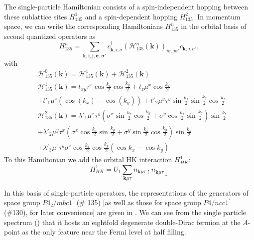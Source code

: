 \documentclass[prb,aps,amssymb,twocolumn,notitlepage]{revtex4-2}
\begin{document}
The single-particle Hamiltonian consists of a spin-independent hopping between these sublattice sites $H^{1}_{135}$ and a spin-dependent hopping $H^{2}_{135}$. 
In momentum space, we can write the corresponding Hamiltonians $H^{n}_{135}$ in the orbital basis of second quantized operators as
 \begin{equation}
 H^{n}_{135} = \sum_\mathbf{\mathbf{k},i,j,\sigma,\sigma'}c^\dagger_{\mathbf{k},i,\sigma}(\mathcal{H}^{n}_{135}(\mathbf{k}))_{i\sigma,j\sigma'} c_{\mathbf{k},j,\sigma'},
 \end{equation}
 with
\begin{align}
    \label{eq:135 Hamiltonian}
    &\mathcal{H}^{0}_{135}(\mathbf{k})=\mathcal{H}^{1}_{135}(\mathbf{k})+\mathcal{H}^{2}_{135}(\mathbf{k})\nonumber \\
    &\mathcal{H}^{1}_{135}(\mathbf{k})=t_{xy}\tau^x\cos\tfrac{k_x}{2}\cos\tfrac{k_y}{2}+t_{z}\mu^x\cos\tfrac{k_z}{2} \\
    &+t'_{1}\mu^z(\cos(k_x)-\cos(k_y))+t'_{2}\mu^y\tau^y\sin\tfrac{k_x}{2}\sin\tfrac{k_y}{2}\cos\tfrac{k_z}{2} \nonumber \\
    &\mathcal{H}^{2}_{135}(\mathbf{k})=\lambda'_{1}\mu^x\tau^y\left(\sigma^x\sin\tfrac{k_x}{2}\cos\tfrac{k_y}{2}+\sigma^y\cos\tfrac{k_x}{2}\sin\tfrac{k_y}{2}\right)\sin\tfrac{k_z}{2} \nonumber\\
    &+\lambda'_{2}\mu^y\tau^x\left(\sigma^x\cos\tfrac{k_x}{2}\sin\tfrac{k_y}{2}+\sigma^y\sin\tfrac{k_x}{2}\cos\tfrac{k_y}{2}\right)\sin\tfrac{k_z}{2} \nonumber \\
    &+\lambda'_3\mu^z\tau^y\sigma^z\cos\tfrac{k_x}{2}\cos\tfrac{k_y}{2}(\cos k_x-\cos k_y)\nonumber
\end{align}
To this Hamiltonian we add the orbital HK interaction $H^{1}_{HK}$:
\begin{equation}\label{eq:sg135orbitalhk}
H^{1}_{HK}=U_{1}\sum_{\mathbf{k}\mu\tau}n_{\mathbf{k}\mu\tau\uparrow}n_{\mathbf{k}\mu\tau\downarrow}
\end{equation}

In this basis of single-particle operators, the representations of the generators of space group $P4_2/mbc1^\prime$ (\# 135) [as well as those for space group $P4/ncc1^\prime$ (\#130), for later convenience] are given in .
We can see from the single particle spectrum () that it hosts an eightfold degenerate double-Dirac fermion at the $A$-point as the only feature near the Fermi level at half filling.
\end{document}
